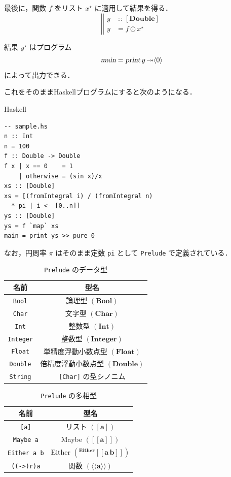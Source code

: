 \documentclass[a5paper,twoside,fleqn,draft]{jsbook}
\def\[{[\![}
\def\]{]\!]}
\newcommand{\Langle}{\langle\!\langle}
\newcommand{\Rangle}{\rangle\!\rangle}
\newcommand{\programminglanguage}[1]{\textsf{#1}}
\newcommand{\haskell}{\programminglanguage{Haskell}}
\newcommand{\code}[1]{\texttt{#1}}
\newcommand{\filename}[1]{\texttt{#1}}
\newenvironment{haskellcode}{\begin{itembox}[r]{\haskell}}{\end{itembox}}
\newcommand{\mBrace}{\Vert}
\newcommand{\mAction}[1]{\textsl{#1}}
\DeclareMathOperator{\mMain}{\mAction{main}}
\DeclareMathOperator{\mPrint}{\mAction{print}}
\DeclareMathOperator{\mBindRightIgnore}{\twoheadrightarrow}
\DeclareMathOperator{\mIn}{{:\!:}}
\DeclareMathOperator{\mMapList}{\odot}
\newcommand{\mType}[1]{\mathbf{#1}} %
\newcommand{\mA}{\mType{a}}
\newcommand{\mBoolType}{\mType{Bool}}
\newcommand{\mCharType}{\mType{Char}}
\newcommand{\mFloatType}{\mType{Float}}
\newcommand{\mDoubleType}{\mType{Double}}
\newcommand{\mIntType}{\mType{Int}}
\newcommand{\mIntegerType}{\mType{Integer}}
\newcommand{\mFuncType}[2]{\Langle\mType{#1}\Rangle}%
\newcommand{\mTypeAssemble}[2]{{}^{\mType{#1}}\[\mType{#2}\]}
\newcommand{\mTypeAssembleII}[3]{{}^{\mType{#1}}\[\mType{#2}\,\mType{#3}\]}
\newcommand{\mEitherType}[2]{\mTypeAssembleII{Either}{#1}{#2}}
\newcommand{\mMaybeType}[1]{\[\mType{#1}\]}%
\newcommand{\mPureWith}[1]{\langle#1\rangle}
\newcommand{\mList}[1]{{#1}^\mathrm{\star}}
\begin{document}
最後に，関数 $f$ をリスト $\mList{x}$ に適用して結果を得る．
\begin{equation}
  \left\mBrace
  \begin{aligned}
    y
    &\mIn{}[\mDoubleType]\\
    y
    &=f\mMapList\mList{x}
  \end{aligned}
  \right.
\end{equation}

結果 $\mList{y}$ はプログラム
\begin{equation}
\mMain=\mPrint y\mBindRightIgnore\mPureWith{0}
\end{equation}
によって出力できる．

これをそのまま\haskell プログラムにすると次のようになる．
\begin{haskellcode}
\begin{verbatim}
-- sample.hs
n :: Int
n = 100
f :: Double -> Double
f x | x == 0    = 1
    | otherwise = (sin x)/x
xs :: [Double]
xs = [(fromIntegral i) / (fromIntegral n)
  * pi | i <- [0..n]]
ys :: [Double]
ys = f `map` xs
main = print ys >> pure 0
\end{verbatim}
\end{haskellcode}

なお，円周率 $\pi$ はそのまま定数 \code{pi} として \filename{Prelude}
で定義されている．

\begin{table}
\caption{\filename{Prelude} のデータ型}
\label{tab:data-types}
\begin{center}
\begin{tabular}{||c|c||}
\hline
名前&型名\\
\hline\hline
\code{Bool}&論理型 $(\mBoolType)$\\
\code{Char}&文字型 $(\mCharType)$\\
\code{Int}&整数型 $(\mIntType)$\\
\code{Integer}&整数型 $(\mIntegerType)$\\
\code{Float}&単精度浮動小数点型 $(\mFloatType)$\\
\code{Double}&倍精度浮動小数点型 $(\mDoubleType)$\\
\code{String}&\code{[Char]} の型シノニム\\
\hline
\end{tabular}
\end{center}
\end{table}

\begin{table}
\caption{\filename{Prelude} の多相型}
\label{tab:data-types-polymorphic}
\begin{center}
\begin{tabular}{||c|c||}
\hline
名前&型名\\
\hline\hline
\code{[a]}&リスト $([\mA])$\\
\code{Maybe a}&Maybe $\left(\mMaybeType{a}\right)$\\
\code{Either a b}&Either $\left(\mEitherType{a}{b}\right)$\\
\code{((->)r)a}&関数 $\left(\mFuncType{a}{r}\right)$\\
\hline
\end{tabular}
\end{center}
\end{table}
\end{document}
